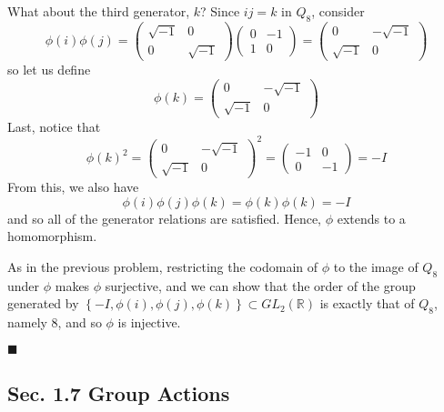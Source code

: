\documentclass[12pt]{article}
\renewcommand{\qed}{\hfill$\blacksquare$}
\renewenvironment{proof}{\begin{addmargin}[1em]{0em}\begin{newproof}}{\end{newproof}\end{addmargin}\qed}
\begin{document}
\begin{proof}
What about the third generator, $k$? Since $ij=k$ in $Q_8$, consider
$$ \phi\left(i\right)\phi\left(j\right) = \left( \begin{array}{cc} \sqrt{-1} & 0 \\ 0 & \sqrt{-1} \end{array}\right)\left( \begin{array}{cc} 0 & -1 \\ 1 & 0 \end{array}\right) = \left(\begin{array}{cc} 0 & -\sqrt{-1} \\ \sqrt{-1} & 0 \end{array}\right) $$ so let us define $$ \phi\left(k\right) = \left(\begin{array}{cc} 0 & -\sqrt{-1} \\ \sqrt{-1} & 0 \end{array}\right) $$ Last, notice that
$$ \phi\left(k\right)^2 = \left(\begin{array}{cc} 0 & -\sqrt{-1} \\ \sqrt{-1} & 0 \end{array}\right)^2 = \left(\begin{array}{cc} -1 & 0 \\ 0 & -1 \end{array}\right) = -I $$ From this, we also have
$$ \phi\left(i\right)\phi\left(j\right)\phi\left(k\right) = \phi\left(k\right)\phi\left(k\right) = -I $$ and so all of the generator relations are satisfied. Hence, $\phi$ extends to a homomorphism.

As in the previous problem, restricting the codomain of $\phi$ to the image of $Q_8$ under $\phi$ makes $\phi$ surjective, and we can show that the order of the group generated by $\left\{-I, \phi\left(i\right),\phi\left(j\right),\phi\left(k\right)\right\}\subset GL_2\left(\mathbb{R}\right)$ is exactly that of $Q_8$, namely 8, and so $\phi$ is injective.
\end{proof}







\subsection*{Sec. 1.7 Group Actions}
\end{document}
